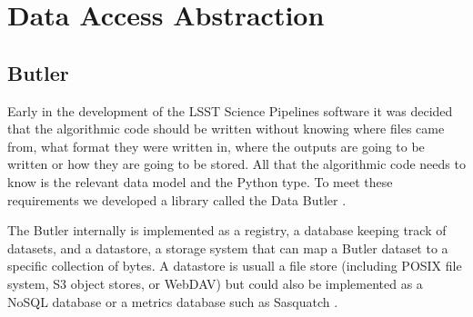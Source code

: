 \section{Data Access Abstraction}
\label{sec:data-access}

\subsection{Butler}

Early in the development of the LSST Science Pipelines software it was decided that the algorithmic code should be written without knowing where files came from, what format they were written in, where the outputs are going to be written or how they are going to be stored.
All that the algorithmic code needs to know is the relevant data model and the Python type.
To meet these requirements we developed a library called the Data Butler \citep[see e.g.,][]{2022SPIE12189E..11J,2023arXiv230303313L}.

The Butler internally is implemented as a registry, a database keeping track of datasets, and a datastore, a storage system that can map a Butler dataset to a specific collection of bytes.
A datastore is usuall a file store (including POSIX file system, S3 object stores, or WebDAV) but could also be implemented as a NoSQL database or a metrics database such as Sasquatch \citep{SQR-068}.

